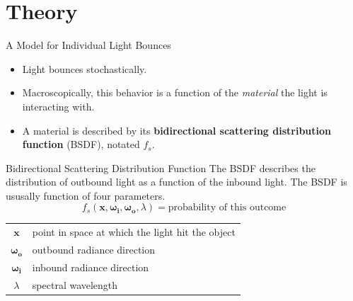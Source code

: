 \documentclass[10pt]{beamer}
\DeclarePairedDelimiter\ip{\langle }{\rangle}
\begin{document}
\section{Theory}
\begin{frame}{A Model for Individual Light Bounces}
  \begin{itemize}
  \item Light bounces stochastically.
  \item Macroscopically, this behavior is a function of the \textit{material} the light is interacting with.
  \item A material is described by its \textbf{bidirectional scattering distribution function} (BSDF), notated \(f_s\).
  \end{itemize}
\end{frame}


\begin{frame}{Bidirectional Scattering Distribution Function}
  The BSDF describes the distribution of outbound light as a function of the inbound light.
  The BSDF is ususally function of four parameters.
  \[f_s(\mathbf x, \bm{\omega_i}, \bm{\omega_o}, \lambda) = \text{probability of this outcome}\]

  \hrulefill

  \begin{center}
    \begin{tabu}{cl}
      \(\mathbf x\) & point in space at which the light hit the object\\
      \(\bm{\omega_o}\) & outbound radiance direction\\
      \(\bm{\omega_i}\) & inbound radiance direction\\
      \(\lambda\) & spectral wavelength\\
    \end{tabu}
  \end{center}
\end{frame}

\end{document}
